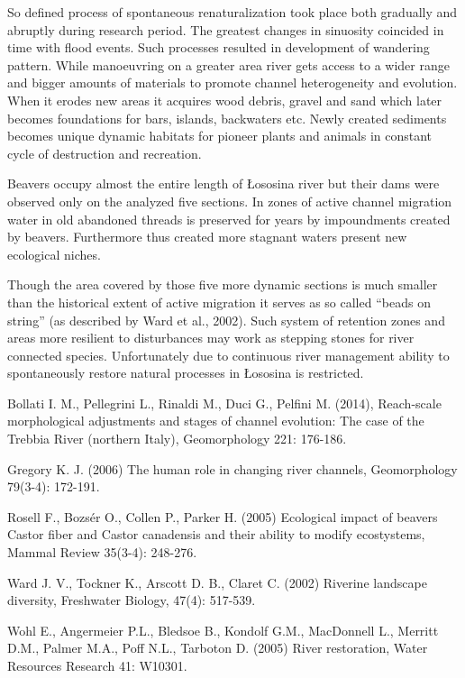 {So defined process of spontaneous renaturalization took place both gradually and abruptly during research period. The greatest changes in sinuosity coincided in time with flood events. Such processes resulted in development of wandering pattern. While manoeuvring on a greater area river gets access to a wider range and bigger amounts of materials to promote channel heterogeneity and evolution. When it erodes new areas it acquires wood debris, gravel and sand which later becomes foundations for bars, islands, backwaters etc. Newly created sediments becomes unique dynamic habitats for pioneer plants and animals in constant cycle of destruction and recreation.
	
Beavers occupy almost the entire length of Łososina river but their dams were observed only on the analyzed five sections. In zones of active channel migration water in old abandoned threads is preserved for years by impoundments created by beavers. Furthermore thus created more stagnant waters present new ecological niches.
	
Though the area covered by those five more dynamic sections is much smaller than the historical extent of active migration it serves as so called \enquote{beads on string} (as described by Ward et al., 2002). Such system of retention zones and areas more resilient to disturbances may work as stepping stones for river connected species. Unfortunately due to continuous river management ability to spontaneously restore natural processes in Łososina is restricted.
}%

{Bollati I. M., Pellegrini L., Rinaldi M., Duci G., Pelfini M. (2014), Reach-scale morphological adjustments and stages of channel evolution: The case of the Trebbia River (northern Italy), Geomorphology 221: 176-186. 
	
	Gregory K. J. (2006) The human role in changing river channels, Geomorphology 79(3-4): 172-191.
	
	Rosell F., Bozsér O., Collen P., Parker H. (2005) Ecological impact of beavers Castor fiber and Castor canadensis and their ability to modify ecostystems, Mammal Review 35(3-4): 248-276. 
	
	Ward J. V., Tockner K., Arscott D. B., Claret C. (2002) Riverine landscape diversity, Freshwater Biology, 47(4): 517-539.
	
	Wohl E., Angermeier P.L., Bledsoe B., Kondolf G.M., MacDonnell L., Merritt D.M., Palmer M.A., Poff N.L., Tarboton D. (2005) River restoration, Water Resources Research 41: W10301.
}%

